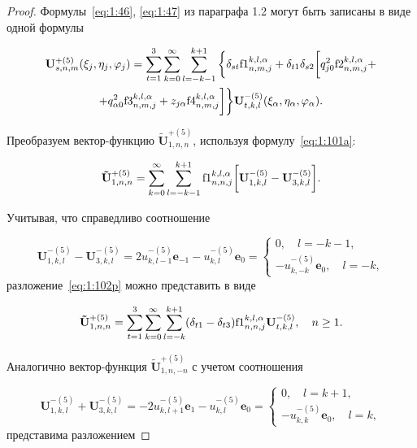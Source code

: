 \begin{proof}
Формулы~\eqref{eq:1:46}, \eqref{eq:1:47} из параграфа 1.2 могут быть записаны в виде одной формулы

\begin{multline}\label{eq:1:101a}
\mathbf{U}_{s,n,m}^{+(5)}(\xi_j,\eta_j,\varphi_j)=\sum\limits_{t=1}^3\sum\limits_{k=0}^\infty\sum\limits_{l=-k-1}^{k+1}\bigg\{\delta_{st}{\rm f1}_{n,m,j}^{k,l,\alpha}+\delta_{t1}\delta_{s2}\bigg[q_{j0}^2{\rm f2}_{n,m,j}^{k,l,\alpha}+ \\
+ q_{\alpha 0}^2{\rm f3}_{n,m,j}^{k,l,\alpha}+z_{j\alpha}{\rm f4}_{n,m,j}^{k,l,\alpha}\bigg]\bigg\}\mathbf{U}_{t,k,l}^{-(5)}(\xi_\alpha,\eta_\alpha,\varphi_\alpha).
\end{multline}

Преобразуем вектор-функцию $\mathbf{\tilde U}_{1,n,n}^{+(5)}$, используя формулу~\eqref{eq:1:101a}:

\begin{equation}
\mathbf{\tilde U}_{1,n,n}^{+(5)}=\sum\limits_{k=0}^\infty\sum\limits_{l=-k-1}^{k+1}{\rm f1}_{n,n,j}^{k,l,\alpha}\bigg[\mathbf{U}_{1,k,l}^{-(5)}-\mathbf{U}_{3,k,l}^{-(5)}\bigg].
\label{eq:1:102p}
\end{equation}

\noindent Учитывая, что справедливо соотношение

\begin{equation*}
\mathbf{U}_{1,k,l}^{-(5)}-\mathbf{U}_{3,k,l}^{-(5)}=2u_{k,l-1}^{-(5)}\mathbf{e}_{-1}-u_{k,l}^{-(5)}\mathbf{e}_0=
\begin{cases}
0,\quad l=-k-1, \\
-u_{k,-k}^{-(5)}\mathbf{e}_0,\quad l=-k,
\end{cases}
\end{equation*}
разложение~\eqref{eq:1:102p} можно представить в виде

\begin{equation}
\mathbf{\tilde U}_{1,n,n}^{+(5)}=\sum\limits_{t=1}^3\sum\limits_{k=0}^\infty\sum\limits_{l=-k}^{k+1}(\delta_{t1}-\delta_{t3}){\rm f1}_{n,n,j}^{k,l,\alpha}\mathbf{U}_{t,k,l}^{-(5)},\quad n\ge 1.
\label{eq:1:103p}
\end{equation}

Аналогично вектор-функция $\mathbf{\tilde U}_{1,n,-n}^{+(5)}$ с учетом соотношения

\begin{equation*}
\mathbf{U}_{1,k,l}^{-(5)}+\mathbf{U}_{3,k,l}^{-(5)}=-2u_{k,l+1}^{-(5)}\mathbf{e}_{1}-u_{k,l}^{-(5)}\mathbf{e}_0=
\begin{cases}
0,\quad l=k+1, \\
-u_{k,k}^{-(5)}\mathbf{e}_0,\quad l=k,
\end{cases}
\end{equation*}
представима разложением


\end{proof}
